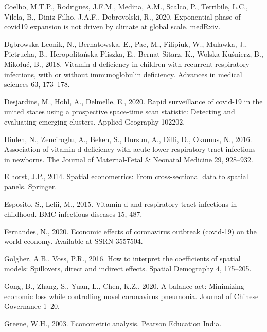 \documentclass[]{elsarticle} %
\begin{document}
\leavevmode\hypertarget{ref-Coelho2020exponential}{}%
Coelho, M.T.P., Rodrigues, J.F.M., Medina, A.M., Scalco, P., Terribile,
L.C., Vilela, B., Diniz-Filho, J.A.F., Dobrovolski, R., 2020.
Exponential phase of covid19 expansion is not driven by climate at
global scale. medRxiv.

\leavevmode\hypertarget{ref-Dux105browska2018vitamin}{}%
Dąbrowska-Leonik, N., Bernatowska, E., Pac, M., Filipiuk, W., Mulawka,
J., Pietrucha, B., Heropolitańska-Pliszka, E., Bernat-Sitarz, K.,
Wolska-Kuśnierz, B., Mikołuć, B., 2018. Vitamin d deficiency in children
with recurrent respiratory infections, with or without immunoglobulin
deficiency. Advances in medical sciences 63, 173--178.

\leavevmode\hypertarget{ref-Desjardins2020rapid}{}%
Desjardins, M., Hohl, A., Delmelle, E., 2020. Rapid surveillance of
covid-19 in the united states using a prospective space-time scan
statistic: Detecting and evaluating emerging clusters. Applied Geography
102202.

\leavevmode\hypertarget{ref-Dinlen2016association}{}%
Dinlen, N., Zenciroglu, A., Beken, S., Dursun, A., Dilli, D., Okumus,
N., 2016. Association of vitamin d deficiency with acute lower
respiratory tract infections in newborns. The Journal of Maternal-Fetal
\& Neonatal Medicine 29, 928--932.

\leavevmode\hypertarget{ref-Elhorst2014spatial}{}%
Elhorst, J.P., 2014. Spatial econometrics: From cross-sectional data to
spatial panels. Springer.

\leavevmode\hypertarget{ref-Esposito2015vitamin}{}%
Esposito, S., Lelii, M., 2015. Vitamin d and respiratory tract
infections in childhood. BMC infectious diseases 15, 487.

\leavevmode\hypertarget{ref-Fernandes2020economic}{}%
Fernandes, N., 2020. Economic effects of coronavirus outbreak (covid-19)
on the world economy. Available at SSRN 3557504.

\leavevmode\hypertarget{ref-Golgher2016interpret}{}%
Golgher, A.B., Voss, P.R., 2016. How to interpret the coefficients of
spatial models: Spillovers, direct and indirect effects. Spatial
Demography 4, 175--205.

\leavevmode\hypertarget{ref-Gong2020balance}{}%
Gong, B., Zhang, S., Yuan, L., Chen, K.Z., 2020. A balance act:
Minimizing economic loss while controlling novel coronavirus pneumonia.
Journal of Chinese Governance 1--20.

\leavevmode\hypertarget{ref-Greene2003econometric}{}%
Greene, W.H., 2003. Econometric analysis. Pearson Education India.
\end{document}
